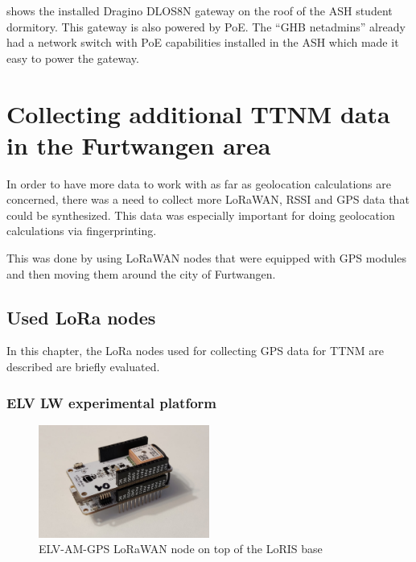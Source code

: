  shows the installed Dragino DLOS8N gateway on the roof of the \ac{ASH} student dormitory.
This gateway is also powered by \ac{PoE}.
The ``\ac{GHB} netadmins'' already had a network switch with \ac{PoE} capabilities installed in the \ac{ASH} which made it easy to power the gateway.

\section{Collecting additional \acf{TTNM} data in the Furtwangen area}\label{sec:collecting-additional-ttnm-data}

In order to have more data to work with as far as geolocation calculations are concerned, there was a need to collect more \ac{LoRaWAN}, \ac{RSSI} and \ac{GPS} data that could be synthesized.
This data was especially important for doing geolocation calculations via fingerprinting.

This was done by using \ac{LoRaWAN} nodes that were equipped with \ac{GPS} modules and then moving them around the city of Furtwangen.

\subsection{Used \acs{LoRa} nodes}

In this chapter, the \ac{LoRa} nodes used for collecting \ac{GPS} data for \ac{TTNM} are described are briefly evaluated.

\subsubsection{ELV LW experimental platform}

\begin{figure}
    \centering
    \includegraphics[width=0.5\textwidth]{pictures/hardware/gps-nodes/loris_bare.jpg}
    \caption{ELV-AM-GPS \ac{LoRaWAN} node on top of the LoRIS base\label{pic:loris-node-bare}}
\end{figure}

